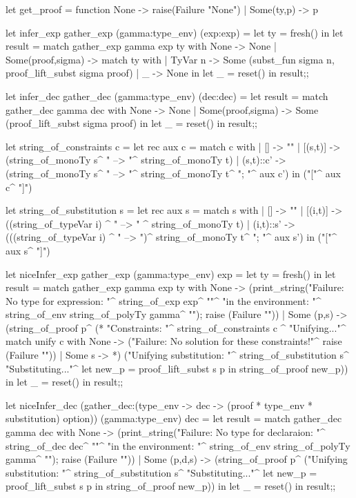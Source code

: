 let get_proof = function
   None       -> raise(Failure "None")
 | Some(ty,p) -> p

let infer_exp gather_exp (gamma:type_env) (exp:exp) = 
  let ty = fresh() in
  let result = 
    match gather_exp gamma exp ty with
       None         -> None
     | Some(proof,sigma) -> match ty with
          | TyVar n -> Some (subst_fun sigma n, proof_lift_subst sigma proof)
          | _       -> None
  in let _ = reset() in
  result;;

let infer_dec gather_dec (gamma:type_env) (dec:dec) =
  let result = 
    match gather_dec gamma dec with
       None -> None
     | Some(proof,sigma) -> Some (proof_lift_subst sigma proof)
  in let _ = reset() in
  result;;

let string_of_constraints c =
  let rec aux c =
     match c with 
     | [] -> ""
     | [(s,t)] ->  (string_of_monoTy s^ " --> "^ string_of_monoTy t)
     | (s,t)::c' -> (string_of_monoTy s^ " --> "^ string_of_monoTy t^
		     "; "^ aux c')
  in ("["^ aux c^ "]\n")

 
let string_of_substitution s =
  let rec aux s =
     match s with 
     | [] -> ""
     | [(i,t)] -> ((string_of_typeVar i)  ^ " --> " ^ string_of_monoTy t)
     | (i,t)::s' -> (((string_of_typeVar i)  ^ " --> ")^
                     string_of_monoTy t^ "; "^ aux s')
  in ("["^ aux s^ "]\n")


let niceInfer_exp gather_exp (gamma:type_env) exp = 
  let ty = fresh()
  in
  let result = 
    match gather_exp gamma exp ty with
     None ->
      (print_string("Failure: No type for expression: "^
       string_of_exp exp^ "\n"^
       "in the environment: "^
       string_of_env string_of_polyTy gamma^ "\n");
       raise (Failure ""))
   | Some (p,s) ->
   (string_of_proof p^
	(*
   "Constraints: "^
   string_of_constraints c ^
   "Unifying..."^
   match unify c with
     None -> ("Failure: No solution for these constraints!\n"^
              raise (Failure ""))
   | Some s ->
	*)
   ("Unifying substitution: "^
    string_of_substitution s^
    "Substituting...\n"^
    let new_p = proof_lift_subst s p in
    string_of_proof new_p)) in
  let _ = reset() in
  result;;

let niceInfer_dec
    (gather_dec:(type_env -> dec -> (proof * type_env * substitution) option))
    (gamma:type_env) dec = 
  let result = 
    match gather_dec gamma dec with
     None ->
      (print_string("Failure: No type for declaraion: "^
       string_of_dec dec^ "\n"^
       "in the environment: "^
       string_of_env string_of_polyTy gamma^ "\n");
       raise (Failure ""))
   | Some (p,d,s) ->
   (string_of_proof p^
   ("Unifying substitution: "^
    string_of_substitution s^
    "Substituting...\n"^
    let new_p = proof_lift_subst s p in
    string_of_proof new_p)) in
  let _ = reset() in
  result;;

